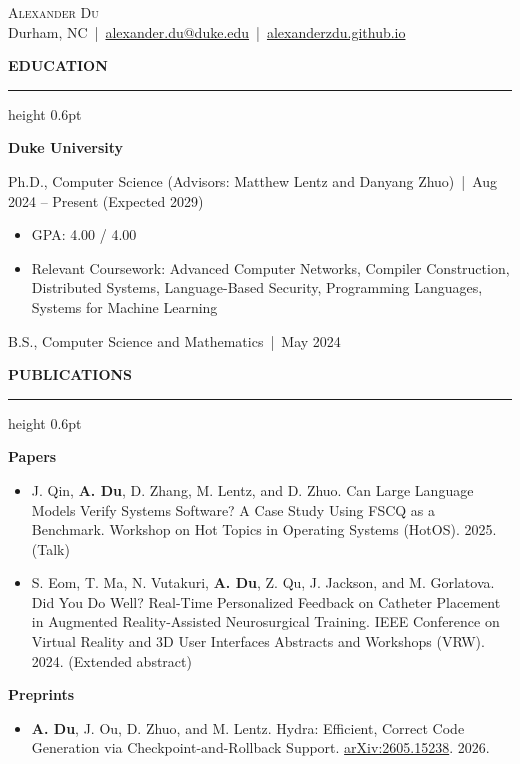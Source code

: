 \documentclass[11pt,letterpaper]{article}
\makeatletter
\newcommand{\cvsection}[1]{%
  \par\penalty-50\addvspace{8pt}%
  {\bfseries\small\MakeUppercase{#1}\par}\nobreak
  \vspace{3pt}\hrule height 0.6pt\nobreak%
  \addvspace{5pt}%
  \@afterheading}
\newcommand{\cvsubsection}[1]{%
  \par\addvspace{2pt}%
  {\bfseries #1\par}\nobreak%
  \@afterheading}
\newcommand{\entry}[2]{#1 \,|\, #2\par}
\newenvironment{pubs}{\begin{itemize}[label={}, leftmargin=0pt, itemsep=2pt, topsep=0pt]}{\end{itemize}}
\newcommand{\pub}[3]{\item #1 #2. #3}
\newcommand{\me}{\textbf{A. Du}}
\makeatother
\begin{document}
\begin{center}
  {\LARGE\scshape Alexander Du}\\
  Durham, NC \,|\,
  \href{mailto:alexander.du@duke.edu}{alexander.du@duke.edu} \,|\,
  \href{https://alexanderzdu.github.io}{alexanderzdu.github.io}
\end{center}

\cvsection{Education}
\cvsubsection{Duke University}
\entry{Ph.D., Computer Science (Advisors: Matthew Lentz and Danyang Zhuo)}{Aug 2024 -- Present (Expected 2029)}
\begin{itemize}
  \item GPA: 4.00 / 4.00
  \item Relevant Coursework: Advanced Computer Networks, Compiler Construction, Distributed Systems, Language-Based Security, Programming Languages, Systems for Machine Learning
\end{itemize}
\entry{B.S., Computer Science and Mathematics}{May 2024}

\cvsection{Publications}
\cvsubsection{Papers}
\begin{pubs}
\pub{J. Qin, \me, D. Zhang, M. Lentz, and D. Zhuo.}
    {Can Large Language Models Verify Systems Software? A Case Study Using FSCQ as a Benchmark}
    {Workshop on Hot Topics in Operating Systems (HotOS). 2025. (Talk)}
\pub{S. Eom, T. Ma, N. Vutakuri, \me, Z. Qu, J. Jackson, and M. Gorlatova.}
    {Did You Do Well? Real-Time Personalized Feedback on Catheter Placement in Augmented Reality-Assisted Neurosurgical Training}
    {IEEE Conference on Virtual Reality and 3D User Interfaces Abstracts and Workshops (VRW). 2024. (Extended abstract)}
\end{pubs}

\cvsubsection{Preprints}
\begin{pubs}
\pub{\me, J. Ou, D. Zhuo, and M. Lentz.}
    {Hydra: Efficient, Correct Code Generation via Checkpoint-and-Rollback Support}
    {\href{https://arxiv.org/abs/2605.15238}{arXiv:2605.15238}. 2026.}
\end{pubs}
\end{document}
